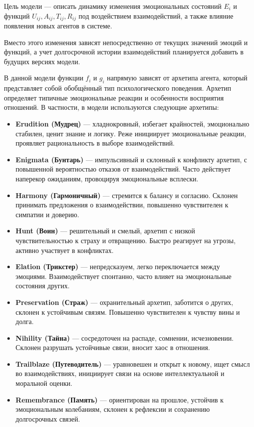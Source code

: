 \documentclass[12pt]{article}
\begin{document}
Цель модели — описать динамику изменения эмоциональных состояний \(E_i\) и функций \(U_{ij}, A_{ij}, T_{ij}, R_{ij} \) под воздействием взаимодействий, а также влияние появления новых агентов в системе.



Вместо этого изменения зависят непосредственно от текущих значений эмоций и функций, а учет долгосрочной истории взаимодействий планируется добавить в будущих версиях модели.




В данной модели функции \( f_i \) и \( g_i \) напрямую зависят от архетипа агента, который представляет собой обобщённый тип психологического поведения. Архетип определяет типичные эмоциональные реакции и особенности восприятия отношений. В частности, в модели используются следующие архетипы:


\begin{itemize}
    \item \textbf{Erudition (Мудрец)} — хладнокровный, избегает крайностей, эмоционально стабилен, ценит знание и логику. Реже инициирует эмоциональные реакции, проявляет рациональность в выборе взаимодействий.
    \item \textbf{Enigmata (Бунтарь)} — импульсивный и склонный к конфликту архетип, с повышенной вероятностью отказов от взаимодействий. Часто действует наперекор ожиданиям, провоцируя эмоциональные всплески.
    \item \textbf{Harmony (Гармоничный)} — стремится к балансу и согласию. Склонен принимать предложения о взаимодействии, повышенно чувствителен к симпатии и доверию.
    \item \textbf{Hunt (Воин)} — решительный и смелый, архетип с низкой чувствительностью к страху и отвращению. Быстро реагирует на угрозы, активно участвует в конфликтах.
    \item \textbf{Elation (Трикстер)} — непредсказуем, легко переключается между эмоциями. Взаимодействует спонтанно, часто влияет на эмоциональные состояния других.
    \item \textbf{Preservation (Страж)} — охранительный архетип, заботится о других, склонен к устойчивым связям. Повышенно чувствителен к чувству вины и долга.
    \item \textbf{Nihility (Тайна)} — сосредоточен на распаде, сомнении, исчезновении. Склонен разрушать устойчивые связи, вносит хаос в отношения.
    \item \textbf{Trailblaze (Путеводитель)} — уравновешен и открыт к новому, ищет смысл во взаимодействиях, инициирует связи на основе интеллектуальной и моральной оценки.
    \item \textbf{Remembrance (Память)} — ориентирован на прошлое, устойчив к эмоциональным колебаниям, склонен к рефлексии и сохранению долгосрочных связей.
\end{itemize}
\end{document}
